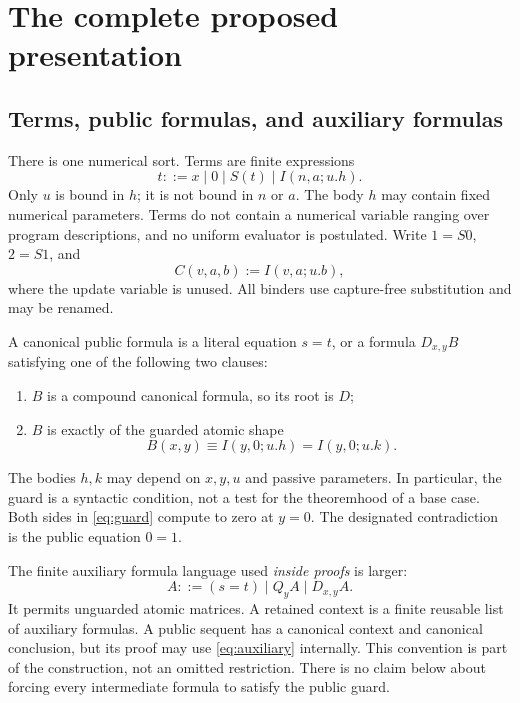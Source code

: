 \section{The complete proposed presentation}
\label{sec:calculus}

\subsection{Terms, public formulas, and auxiliary formulas}

There is one numerical sort. Terms are finite expressions
\[
 t ::= x\mid 0\mid S(t)\mid I(n,a;u.h).
\]
Only $u$ is bound in $h$; it is not bound in $n$ or $a$. The body $h$ may
contain fixed numerical parameters. Terms do not contain a numerical
variable ranging over program descriptions, and no uniform evaluator is
postulated. Write $1=S0$, $2=S1$, and
\[
 C(v,a,b):=I(v,a;u.b),
\]
where the update variable is unused. All binders use capture-free
substitution and may be renamed.

\begin{definition}
A canonical public formula is a literal equation $s=t$, or a formula
$D_{x,y}B$ satisfying one of the following two clauses:
\begin{enumerate}
\item $B$ is a compound canonical formula, so its root is $D$;
\item $B$ is exactly of the guarded atomic shape
\[
 B(x,y)\equiv I(y,0;u.h)=I(y,0;u.k).
 \tag{G}\label{eq:guard}
\]
\end{enumerate}
The bodies $h,k$ may depend on $x,y,u$ and passive parameters. In particular,
the guard is a syntactic condition, not a test for the theoremhood of a base
case. Both sides in \eqref{eq:guard} compute to zero at $y=0$.
The designated contradiction is the public equation $0=1$.
\end{definition}

The finite auxiliary formula language used \emph{inside proofs} is larger:
\[
 A ::= (s=t)\mid Q_yA\mid D_{x,y}A.
 \tag{A}\label{eq:auxiliary}
\]
It permits unguarded atomic matrices. A retained context is a finite reusable
list of auxiliary formulas. A public sequent has a canonical context and
canonical conclusion, but its proof may use \eqref{eq:auxiliary} internally.
This convention is part of the construction, not an omitted restriction.
There is no claim below about forcing every intermediate formula to satisfy
the public guard.

